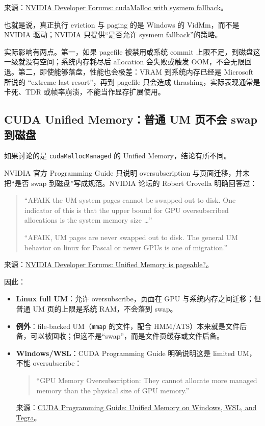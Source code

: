 \documentclass[a4paper, 12pt, linespread=1.35]{ctexart}   %
\newcommand{\keepwithnext}{\par\nobreak}
\begin{document}
\noindent
来源：\href{https://forums.developer.nvidia.com/t/cudamalloc-with-sysmem-fallback/347791}{NVIDIA Developer Forums: cudaMalloc with sysmem fallback}。

也就是说，真正执行 eviction 与 paging 的是 Windows 的 VidMm，而不是 NVIDIA 驱动；NVIDIA 只提供“是否允许 sysmem fallback”的策略。

实际影响有两点。第一，如果 pagefile 被禁用或系统 commit 上限不足，到磁盘这一级就没有空间；系统内存耗尽后 allocation 会失败或触发 OOM，不会无限回退。第二，即使能够落盘，性能也会极差：VRAM 到系统内存已经是 Microsoft 所说的 ``extreme last resort''，再到 pagefile 只会造成 thrashing，实际表现通常是卡死、TDR 或帧率崩溃，不能当作显存扩展使用。

\subsection{CUDA Unified Memory：普通 UM 页不会 swap 到磁盘}

如果讨论的是 \texttt{cudaMallocManaged} 的 Unified Memory，结论有所不同。

NVIDIA 官方 Programming Guide 只说明 oversubscription 与页面迁移，并未把“是否 swap 到磁盘”写成规范。NVIDIA 论坛的 Robert Crovella 明确回答过：

\begin{quote}
\small
``AFAIK the UM system pages cannot be swapped out to disk. One indicator of this is that the upper bound for GPU oversubscribed allocations is the system memory size \ldots''

``AFAIK, UM pages are never swapped out to disk. The general UM behavior on linux for Pascal or newer GPUs is one of migration.''
\end{quote}

\noindent
来源：\href{https://forums.developer.nvidia.com/t/unified-memory-is-pageable-it-can-be-swap-out-to-disk/328918}{NVIDIA Developer Forums: Unified Memory is pageable?}。

因此：\keepwithnext
\begin{itemize}
  \item \textbf{Linux full UM}：允许 oversubscribe，页面在 GPU 与系统内存之间迁移；但普通 UM 页的上限是系统 RAM，不会落到 swap。
  \item \textbf{例外}：file-backed UM（\texttt{mmap} 的文件，配合 HMM/ATS）本来就是文件后备，可以被回收；但这不是“swap”，而是文件页缓存或文件后备。
  \item \textbf{Windows/WSL}：CUDA Programming Guide 明确说明这是 limited UM，不能 oversubscribe：
  \begin{quote}
  \small
  ``GPU Memory Oversubscription: They cannot allocate more managed memory than the physical size of GPU memory.''
  \end{quote}
  来源：\href{https://docs.nvidia.com/cuda/cuda-programming-guide/04-special-topics/unified-memory.html\#unified-memory-on-windows-wsl-and-tegra}{CUDA Programming Guide: Unified Memory on Windows, WSL, and Tegra}。
\end{itemize}
\end{document}
